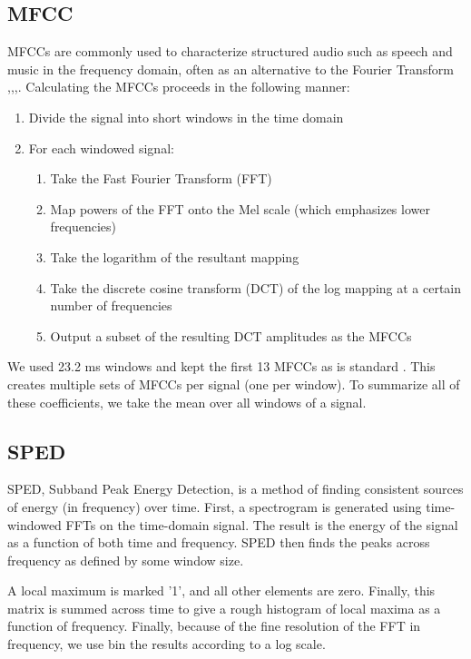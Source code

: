 \documentclass[journal]{IEEEtran}
\begin{document}
\subsection{MFCC}
MFCCs are commonly used to characterize structured audio such as speech and music in the frequency domain, often as an alternative to the Fourier Transform \cite{Chu},\cite{Chu2Env},\cite{guo2003content},\cite{aucouturier2007bag}. Calculating the MFCCs proceeds in the following manner\cite{rabiner1993fundamentals}:
\begin{enumerate}
\item Divide the signal into short windows in the time domain
\item For each windowed signal:
    \begin{enumerate}
    \item Take the Fast Fourier Transform (FFT)
    \item Map powers of the FFT onto the Mel scale (which emphasizes lower frequencies)
    \item Take the logarithm of the resultant mapping
    \item Take the discrete cosine transform (DCT) of the log mapping at a certain number of frequencies
    \item Output a subset of the resulting DCT amplitudes as the MFCCs
    \end{enumerate}
\end{enumerate} 
We used 23.2 ms windows and kept the first 13 MFCCs as is standard \cite{Chu2Env}. This creates multiple sets of MFCCs per signal (one per window). To summarize all of these coefficients, we take the mean over all windows of a signal.
\subsection{SPED}
SPED, Subband Peak Energy Detection, is a method of finding consistent sources of energy (in frequency) over time. First, a spectrogram is generated using time-windowed FFTs on the time-domain signal. The result is the energy of the signal as a function of both time and frequency. SPED then finds the peaks across frequency as defined by some window size. 

A local maximum is marked '1', and all other elements are zero. Finally, this matrix is summed across time to give a rough histogram of local maxima as a function of frequency. Finally, because of the fine resolution of the FFT in frequency, we use bin the results according to a log scale.
\end{document}
